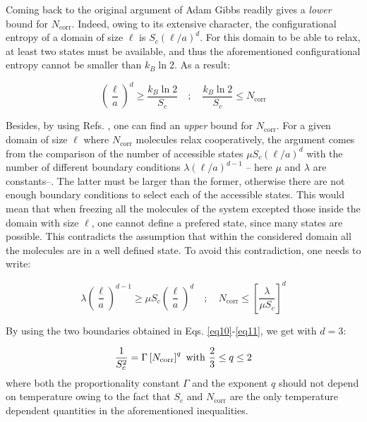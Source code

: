 \documentclass[single column,pre]{revtex4}
\begin{document}
Coming back to the original argument of Adam Gibbs \cite{Ada65} readily gives a \textit{lower} bound for $N_{\text{corr}}$. Indeed, owing to its extensive character, 
the configurational entropy of a domain of size $\ell$ is $S_c (\ell /a )^d$. For this domain to be able to relax, at least two states must be available, and thus the 
aforementioned configurational entropy cannot be smaller than  $k_B \ln{2}$. As a result:

\begin{equation}
\left(\frac{\ell}{a}\right)^d \ge \frac{k_B \ln{2}}{S_c} \quad ; \quad  \frac{k_B \ln{2}}{S_c} \le N_{\text{corr}} 
\label{eq10}
\end{equation}

Besides, by using Refs. \cite{Bou04,New02,Fis03}, one can find an \textit{upper} bound for $N_{\text{corr}}$. 
For a given domain of size $\ell$ where $N_{\text{corr}}$ molecules relax cooperatively, the argument comes from 
the comparison of the number of accessible states $\mu S_c(\ell/a)^d$ with the number of different boundary conditions $\lambda (\ell/a)^{d-1}$ -- here $\mu$ and $\lambda$ are constants--. 
The latter must be larger than the former, otherwise there are not enough boundary conditions to select each of the accessible states. This would mean that when freezing all the 
 molecules of the system excepted those inside the domain with size $\ell$, one cannot define a prefered state, since many states are possible. This contradicts the assumption that within the considered domain all the molecules are in a well defined state. To avoid this contradiction, one needs to write: 

\begin{equation}
\lambda \left(\frac{\ell}{a}\right)^{d-1} \ge \mu S_c \left( \frac{\ell}{a} \right)^d \quad ; \quad N_{\text{corr}} \le \left[ \frac{\lambda}{\mu S_c} \right]^d
\label{eq11}
\end{equation}

By using the two boundaries obtained in Eqs. \ref{eq10}-\ref{eq11}, we get with $d=3$: 

\begin{equation}
\frac{1}{S_c^2} = \Gamma \left[ N_{\text{corr}} \right]^q \hbox{\ with\ } \frac{2}{3} \le q \le 2 
\label{eq12b}
\end{equation}
where both the proportionality constant $\Gamma$ and the exponent $q$ should not depend on temperature owing to the fact that $S_c$ and $N_{\text{corr}}$ are the only temperature dependent quantities 
in the aforementioned inequalities. 
\end{document}
